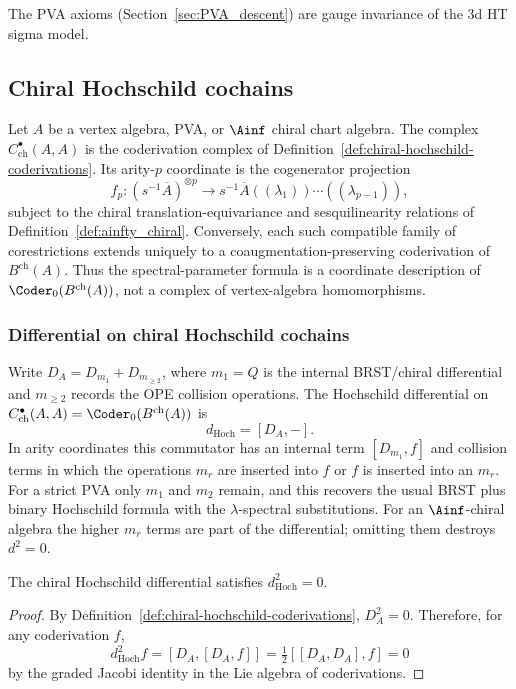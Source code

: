 The PVA axioms (Section~\ref{sec:PVA_descent}) are gauge invariance of the 3d HT sigma model.

\subsection{Chiral Hochschild cochains}

\begin{definition}
\label{def:chiral_hochschild}
Let \(A\) be a vertex algebra, PVA, or \(\Ainf\) chiral chart algebra.
The complex \(C^\bullet_{\mathrm{ch}}(A,A)\) is the coderivation
complex of Definition~\ref{def:chiral-hochschild-coderivations}.  Its
arity-\(p\) coordinate is the cogenerator projection
\[
f_p\colon (s^{-1}\overline A)^{\otimes p}\longrightarrow
s^{-1}\overline A((\lambda_1))\cdots((\lambda_{p-1})),
\]
subject to the chiral translation-equivariance and sesquilinearity
relations of Definition~\ref{def:ainfty_chiral}. Conversely,
each such compatible family of corestrictions extends uniquely to a
coaugmentation-preserving coderivation of \(B^{\mathrm{ch}}(A)\).
Thus the spectral-parameter formula is a coordinate description of
\(\Coder_0(B^{\mathrm{ch}}(A))\), not a complex of vertex-algebra
homomorphisms.
\end{definition}

\subsubsection{Differential on chiral Hochschild cochains}

Write \(D_A=D_{m_1}+D_{m_{\geq 2}}\), where \(m_1=Q\) is the internal
BRST/chiral differential and \(m_{\geq2}\) records the OPE collision
operations.  The Hochschild differential on
\(C^\bullet_{\mathrm{ch}}(A,A)=\Coder_0(B^{\mathrm{ch}}(A))\) is
\[
d_{\mathrm{Hoch}}=[D_A,-].
\]
In arity coordinates this commutator has an internal term
\([D_{m_1},f]\) and collision terms in which the operations \(m_r\)
are inserted into \(f\) or \(f\) is inserted into an \(m_r\).  For a
strict PVA only \(m_1\) and \(m_2\) remain, and this recovers the usual
BRST plus binary Hochschild formula with the \(\lambda\)-spectral
substitutions.  For an \(\Ainf\)-chiral algebra the higher \(m_r\) terms
are part of the differential; omitting them destroys \(d^2=0\).

\begin{lemma}[$d_{\mathrm{Hoch}}^2 = 0$; \ClaimStatusProvedHere]
\label{lem:dch_squared}
The chiral Hochschild differential satisfies \(d_{\mathrm{Hoch}}^2=0\).
\end{lemma}
\begin{proof}
By Definition~\ref{def:chiral-hochschild-coderivations},
\(D_A^2=0\). Therefore, for any coderivation \(f\),
\[
d_{\mathrm{Hoch}}^2f=[D_A,[D_A,f]]
=\tfrac12[[D_A,D_A],f]=0
\]
by the graded Jacobi identity in the Lie algebra of coderivations.
\end{proof}

